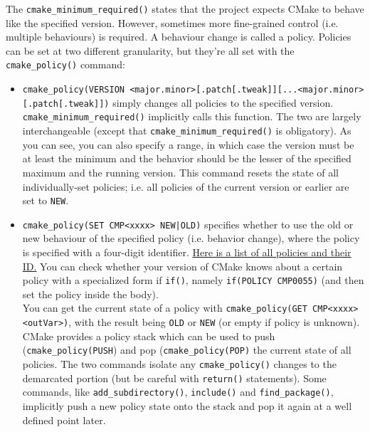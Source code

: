 \documentclass[8pt, table, xcdraw]{article}%
\begin{document}
The \lstinline{cmake_minimum_required()} states that the project expects CMake to behave like the specified version. However, sometimes more fine-grained control (i.e. multiple behaviours) is required. A behaviour change is called a policy. Policies can be set at two different granularity, but they're all set with the \lstinline{cmake_policy()} command:

\begin{itemize}
    \item \lstinline{cmake_policy(VERSION <major.minor>[.patch[.tweak]][...<major.minor>[.patch[.tweak]])} simply changes all policies to the specified version. \lstinline{cmake_minimum_required()} implicitly calls this function. The two are largely interchangeable (except that \lstinline{cmake_minimum_required()} is obligatory). As you can see, you can also specify a range, in which case the version must be at least the minimum and the behavior should be the lesser of the specified maximum and the running version. This command resets the state of all individually-set policies; i.e. all policies of the current version or earlier are set to \lstinline{NEW}.
    \item \lstinline{cmake_policy(SET CMP<xxxx> NEW|OLD)} specifies whether to use the old or new behaviour of the specified policy (i.e. behavior change), where the policy is specified with a four-digit identifier. \href{https://cmake.org/cmake/help/latest/manual/cmake-policies.7.html}{Here is a list of all policies and their ID.} You can check whether your version of CMake knows about a certain policy with a specialized form if \lstinline{if()}, namely \lstinline{if(POLICY CMP0055)} (and then set the policy inside the body).\\
    You can get the current state of a policy with \lstinline{cmake_policy(GET CMP<xxxx> <outVar>)}, with the result being \lstinline{OLD} or \lstinline{NEW} (or empty if policy is unknown).\\
    CMake provides a policy stack which can be used to push (\lstinline{cmake_policy(PUSH}) and pop (\lstinline{cmake_policy(POP)} the current state of all policies. The two commands isolate any \lstinline{cmake_policy()} changes to the demarcated portion (but be careful with \lstinline{return()} statements). Some commands, like \lstinline{add_subdirectory()}, \lstinline{include()} and \lstinline{find_package()}, implicitly push a new policy state onto the stack and pop it again at a well defined point later.
\end{itemize}
\end{document}
